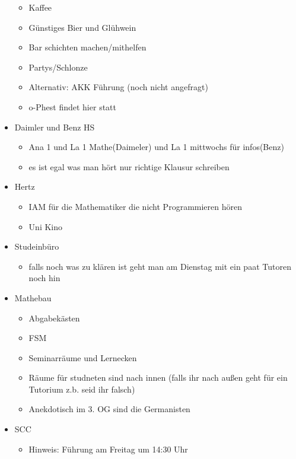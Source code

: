 \documentclass[10pt,ngerman]{scrartcl}
\begin{document}
\begin{multicols}{2}
\begin{itemize}
\begin{itemize}
            \item Kaffee
            \item Günstiges Bier und Glühwein
            \item Bar schichten machen/mithelfen
            \item Partys/Schlonze
            \item Alternativ: AKK Führung (noch nicht angefragt)
            \item o-Phest findet hier statt
        \end{itemize}
    \item Daimler und Benz HS
        \begin{itemize}
            \item Ana 1 und La 1 Mathe(Daimeler) und La 1 mittwochs für infos(Benz)
            \item es ist egal was man hört nur richtige Klausur schreiben
        \end{itemize}
    \item Hertz
        \begin{itemize}
            \item IAM für die Mathematiker die nicht Programmieren hören
            \item Uni Kino
        \end{itemize}
    \item Studeinbüro
        \begin{itemize}
            \item falls noch was zu klären ist geht man am Dienstag mit ein paat Tutoren
                noch hin
        \end{itemize}
    \item Mathebau
        \begin{itemize}
            \item Abgabekästen
            \item FSM
            \item Seminarräume und Lernecken
            \item Räume für studneten sind nach innen (falls ihr nach außen geht für
                ein Tutorium z.b. seid ihr falsch)
            \item Anekdotisch im 3. OG sind die Germanisten
        \end{itemize}
    \item SCC
        \begin{itemize}
            \item Hinweis: Führung am Freitag um 14:30 Uhr
        \end{itemize}

\end{itemize}
\end{multicols}
\end{document}
